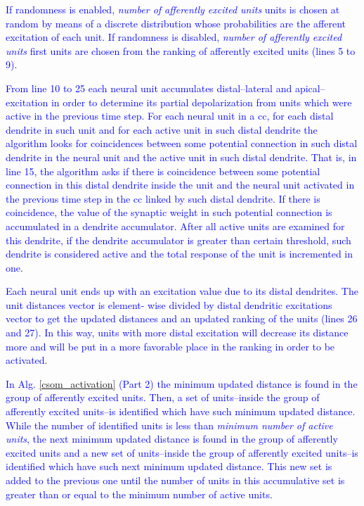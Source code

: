 \documentclass[10pt,letterpaper]{article}
\begin{document}
\textcolor{blue}{If randomness is enabled, \emph{number of afferently excited units} units is chosen at random by means of a discrete distribution whose probabilities are the afferent excitation of each unit. If randomness is disabled, \emph{number of afferently excited units} first units are chosen from the ranking of afferently excited units (lines 5 to 9)}.

\textcolor{blue}{From line 10 to 25 each neural unit accumulates distal--lateral and apical--excitation in order to determine its partial depolarization from units which were active in the previous time step. For each neural unit in a \gls{cc}, for each distal dendrite in such unit and for each active unit in such distal dendrite the algorithm looks for coincidences between some potential connection in such distal dendrite in the neural unit and the active unit in such distal dendrite. That is, in line 15, the algorithm asks if there is coincidence between some potential connection in this distal dendrite inside the unit and the neural unit activated in the previous time step in the \gls{cc} linked by such distal dendrite. If there is coincidence, the value of the synaptic weight in such potential connection is accumulated in a dendrite accumulator. After all active units are examined for this dendrite, if the dendrite accumulator is greater than certain threshold, such dendrite is considered active and the total response of the unit is incremented in one}.

\textcolor{blue}{Each neural unit ends up with an excitation value due to its distal dendrites. The unit distances vector is element- wise divided by distal dendritic excitations vector to get the updated distances and an updated ranking of the units (lines 26 and 27). In this way, units with more distal excitation will decrease its distance more and will be put in a more favorable place in the ranking in order to be activated}.

\textcolor{blue}{In Alg. \ref{csom_activation} (Part 2) the minimum updated distance is found in the group of afferently excited units. Then, a set of units--inside the group of afferently excited units--is identified which have such minimum updated distance. While the number of identified units is less than \emph{minimum number of active units}, the next   minimum updated distance is found in the group of afferently excited units and a new set of units--inside the group of afferently excited units--is identified which have such next minimum updated distance. This new set is added to the previous one until the number of units in this accumulative set is greater than or equal to the minimum number of active units}.
\end{document}
